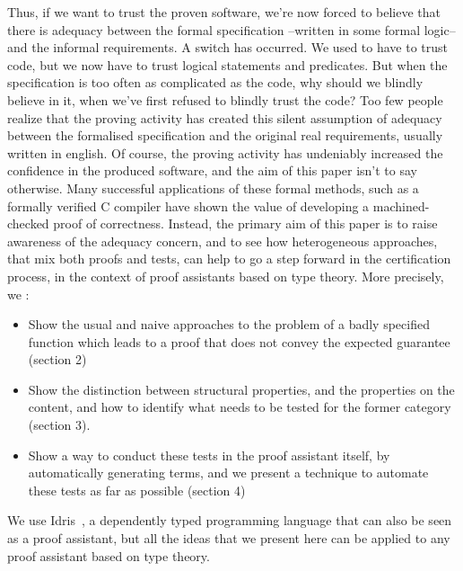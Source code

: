 Thus, if we want to trust the proven software, we're now forced to believe that there is adequacy between the formal specification --written in some formal logic-- and the informal requirements. A switch has occurred. We used to have to trust code, but we now have to trust logical statements and predicates. But when the specification is too often as complicated as the code, why should we blindly believe in it, when we've first refused to blindly trust the code? Too few people realize that the proving activity has created this silent assumption of adequacy between the formalised specification and the original real requirements, usually written in english. Of course, the proving activity has undeniably increased the confidence in the produced software, and the aim of this paper isn't to say otherwise. Many successful applications of these formal methods, such as a formally verified C compiler \cite{Leroy09} have shown the value of developing a machined-checked proof of correctness. Instead, the primary aim of this paper is to raise awareness of the adequacy concern, and to see how heterogeneous approaches, that mix both proofs and tests, can help to go a step forward in the certification process, in the context of proof assistants based on type theory.
More precisely, we :
\begin{itemize}
\item Show the usual and naive approaches to the problem of a badly specified function which leads to a proof that does not convey the expected guarantee (section 2)
\item Show the distinction between structural properties, and the properties on the content, and how to identify what needs to be tested for the former category (section 3).
\item Show a way to conduct these tests in the proof assistant itself, by automatically generating terms, and we present a technique to automate these tests as far as possible (section 4)
\end{itemize}

We use Idris~\cite{brady2013idris}, a dependently typed programming language that can also be seen as a proof assistant, but all the ideas that we present here can be applied to any proof assistant based on type theory.

